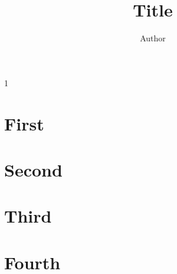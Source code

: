 \documentclass[10pt,twoside,BCOR=12mm,DIV=-calc]{scrreprt}
\begin{document}
\title{Title}
\author{Author}
\begin{spacing}{1}
  \maketitle
\end{spacing}
\tableofcontents
\chapter{First}
\chapter{Second}
\lipsum[1]
\chapter{Third}
\lipsum[1]
\chapter{Fourth}
\lipsum[1]
\end{document}
